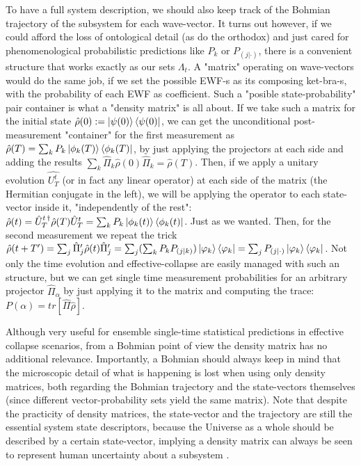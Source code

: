 \documentclass[11pt, a4paper]{article} %
\begin{document}
To have a full system description, we should also keep track of the Bohmian trajectory of the subsystem for each wave-vector. It turns out however, if we could afford the loss of ontological detail (as do the orthodox) and just cared for phenomenological probabilistic predictions like $P_k$ or $P_{(j|\cdot)}$, there is a convenient structure that works exactly as our sets $\Lambda_t$. A "matrix" operating on wave-vectors would do the same job, if we set the possible EWF-s as its composing ket-bra-s, with the probability of each EWF as coefficient. Such a "posible state-probability" pair container is what a "density matrix" \cite{vonNeumann, Durr, Holland} is all about. If we take such a matrix for the initial state $\hat{\rho}(0):=\ket{\psi(0)}\bra{\psi(0)}$, we can get the unconditional post-measurement "container" for the first measurement as $\hat{\rho}(T)=\sum_k P_k\ket{\phi_k(T)}\bra{\phi_k(T)}$, by just applying the projectors at each side and adding the results $\sum_k\hat{\Pi}_k \hat{\rho}(0) \hat{\Pi}_k=\hat{\rho}(T)$. Then, if we apply a unitary evolution $\hat{U_T^t}$ (or in fact any linear operator) at each side of the matrix (the Hermitian conjugate in the left), we will be applying the operator to each state-vector inside it, "independently of the rest": $\hat{\rho}(t)=\hat{U}_T^{t\,\dagger}\hat{\rho}(T)\hat{U}_T^{t}=\sum_k P_k\ket{\phi_k(t)}\bra{\phi_k(t)}$. Just as we wanted. Then, for the second measurement we repeat the trick $\hat{\rho}(t+T')=\sum_j\hat{\Pi}'_j \hat{\rho}(t) \hat{\Pi}'_j=\sum_j (\sum_k P_kP_{(j|k)})\ket{\varphi_k}\bra{\varphi_k}=\sum_j P_{(j|\cdot)}\ket{\varphi_k}\bra{\varphi_k}$. Not only the time evolution and effective-collapse are easily managed with such an structure, but we can get single time measurement probabilities for an arbitrary projector $\hat{\Pi}_\alpha$ by just applying it to the matrix and computing the trace: $P(\alpha)=tr[\hat{\Pi}\hat{\rho}]$.

Although very useful for ensemble single-time statistical predictions in effective collapse scenarios, from a Bohmian point of view the density matrix has no additional relevance. Importantly, a Bohmian should always keep in mind that the microscopic detail of what is happening is lost when using only density matrices, both regarding the Bohmian trajectory and the state-vectors themselves (since different vector-probability sets yield the same matrix). Note that despite the practicity of density matrices, the state-vector and the trajectory are still the essential system state descriptors, because the Universe as a whole should be described by a certain state-vector, implying a density matrix can always be seen to represent human uncertainty about a subsystem \cite{Generalized}.\vspace{-0.2cm}
\end{document}
